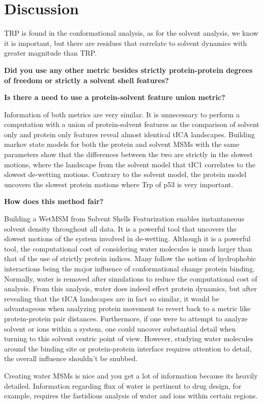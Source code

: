 
\section{Discussion}




TRP is found in the conformational analysis, as for the solvent
analysis, we know it is important, but there are residues that correlate
to solvent dynamics with greater magnitude than TRP.

\textbf{Did you use any other metric besides strictly protein-protein
degrees of freedom or strictly a solvent shell features?}

\textbf{Is there a need to use a protein-solvent feature union metric?}

Information of both metrics are very similar. It is unnecessary to
perform a computation with a union of protein-solvent features as the
comparison of solvent only and protein only features reveal almost
identical tICA landscapes. Building markov state models for both the
protein and solvent MSMs with the same parameters show that the
differences between the two are strictly in the slowest motions, where
the landscape from the solvent model that tIC1 correlates to the slowest
de-wetting motions. Contrary to the solvent model, the protein model
uncovers the slowest protein motions where Trp of p53 is very important.

\textbf{How does this method fair?}

Building a WetMSM from Solvent Shells Featurization enables
instantaneous solvent density throughout all data. It is a powerful tool
that uncovers the slowest motions of the system involved in de-wetting.
Although it is a powerful tool, the computational cost of considering
water molecules is much larger than that of the use of strictly protein
indices. Many follow the notion of hydrophobic interactions being the
major influence of conformational change protein binding. Normally,
water is removed after simulations to reduce the computational cost of
analysis. From this analysis, water does indeed effect protein dynamics,
but after revealing that the tICA landscapes are in fact so similar, it
would be advantageous when analyzing protein movement to revert back to
a metric like protein-protein pair distances. Furthermore, if one were
to attempt to analyze solvent or ions within a system, one could uncover
substantial detail when turning to this solvent centric point of view.
However, studying water molecules around the binding site or
protein-protein interface requires attention to detail, the overall
influence shouldn't be snubbed.

Creating water MSMs is nice and you get a lot of information because its
heavily detailed. Information regarding flux of water is pertinent to
drug design, for example, requires the fastidious analysis of water and
ions within certain regions.







